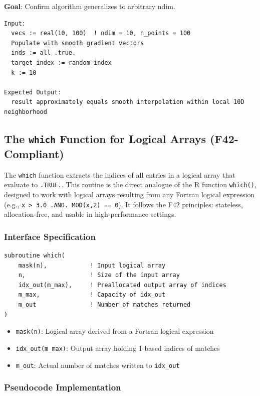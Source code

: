 \documentclass{article}
\begin{document}
\textbf{Goal}: Confirm algorithm generalizes to arbitrary ndim.

\begin{verbatim}
Input:
  vecs := real(10, 100)  ! ndim = 10, n_points = 100
  Populate with smooth gradient vectors
  inds := all .true.
  target_index := random index
  k := 10

Expected Output:
  result approximately equals smooth interpolation within local 10D neighborhood
\end{verbatim}


\subsection{The \texttt{which} Function for Logical Arrays (F42-Compliant)}

The \texttt{which} function extracts the indices of all entries in a logical array that evaluate to \texttt{.TRUE.}. This routine is the direct analogue of the R function \texttt{which()}, designed to work with logical arrays resulting from any Fortran logical expression (e.g., \texttt{x > 3.0 .AND. MOD(x,2) == 0}). It follows the F42 principles: stateless, allocation-free, and usable in high-performance settings.

\subsubsection{Interface Specification}

\begin{verbatim}
subroutine which(
    mask(n),            ! Input logical array
    n,                  ! Size of the input array
    idx_out(m_max),     ! Preallocated output array of indices
    m_max,              ! Capacity of idx_out
    m_out               ! Number of matches returned
)
\end{verbatim}

\begin{itemize}
  \item \texttt{mask(n)}: Logical array derived from a Fortran logical expression
  \item \texttt{idx\_out(m\_max)}: Output array holding 1-based indices of matches
  \item \texttt{m\_out}: Actual number of matches written to \texttt{idx\_out}
\end{itemize}

\subsubsection{Pseudocode Implementation}
\end{document}
